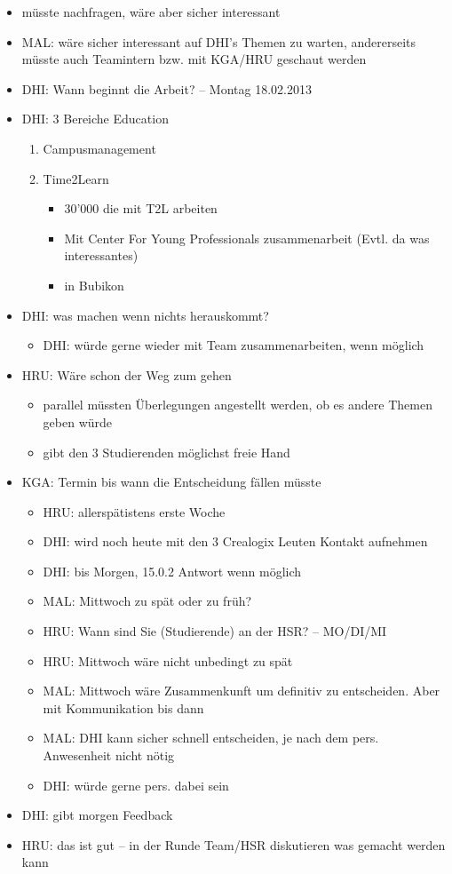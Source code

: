\begin{itemize}
\begin{itemize}
	\end{itemize}
	\item müsste nachfragen, wäre aber sicher interessant
	\item MAL: wäre sicher interessant auf DHI's Themen zu warten, andererseits müsste auch Teamintern bzw. mit KGA/HRU geschaut werden
	\item DHI: Wann beginnt die Arbeit? -- Montag 18.02.2013
	\item DHI: 3 Bereiche Education
	\begin{enumerate}
		\item Campusmanagement
		\item Time2Learn
		\begin{itemize}
			\item 30'000 die mit T2L arbeiten
			\item Mit Center For Young Professionals zusammenarbeit (Evtl. da was interessantes)
			\item in Bubikon
		\end{itemize}
	\end{enumerate}
	\item DHI: was machen wenn nichts herauskommt?
	\begin{itemize}
		\item DHI: würde gerne wieder mit Team zusammenarbeiten, wenn möglich
	\end{itemize}
	\item HRU: Wäre schon der Weg zum gehen
	\begin{itemize}
		\item parallel müssten Überlegungen angestellt werden, ob es andere Themen geben würde 
		\item gibt den 3 Studierenden möglichst freie Hand
	\end{itemize}
	\item KGA: Termin bis wann die Entscheidung fällen müsste
	\begin{itemize}
		\item HRU: allerspätistens erste Woche
		\item DHI: wird noch heute mit den 3 Crealogix Leuten Kontakt aufnehmen
		\item DHI: bis Morgen, 15.0.2 Antwort wenn möglich
		\item MAL: Mittwoch zu spät oder zu früh?
		\item HRU: Wann sind Sie (Studierende) an der HSR? -- MO/DI/MI
		\item HRU: Mittwoch wäre nicht unbedingt zu spät
		\item MAL: Mittwoch wäre Zusammenkunft um definitiv zu entscheiden. Aber mit Kommunikation bis dann
		\item MAL: DHI kann sicher schnell entscheiden, je nach dem pers. Anwesenheit nicht nötig
		\item DHI: würde gerne pers. dabei sein
	\end{itemize}
	\item DHI: gibt morgen Feedback
	\item HRU: das ist gut -- in der Runde Team/HSR diskutieren was gemacht werden kann
\end{itemize}

